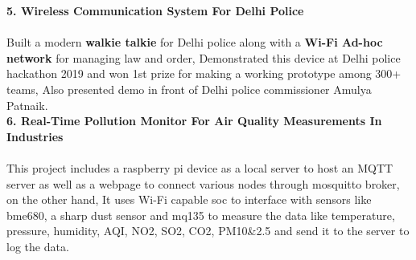 \documentclass[10pt]{report}
\begin{document}
\noindent\textbf{\large 5. Wireless Communication System For Delhi Police\\[1pt]}
\\Built a modern \textbf{walkie talkie} for Delhi police along with a \textbf{Wi-Fi Ad-hoc network} for managing law and order, Demonstrated this device at Delhi police hackathon 2019 and won 1st prize for making a working prototype among 300+ teams, Also presented demo in front of Delhi police commissioner Amulya Patnaik.
\\[1pt]






\noindent\textbf{\large 6. Real-Time Pollution Monitor For Air Quality Measurements In Industries\\[1pt] }
\\This project includes a raspberry pi device as a local server to host an MQTT server as well as a webpage to connect various nodes through mosquitto broker, on the other hand, It uses Wi-Fi capable soc to interface with sensors like bme680, a sharp dust sensor and mq135 to measure the data like temperature, pressure, humidity, AQI, NO2, SO2, CO2, PM10\&2.5 and send it to the server to log the data.
\\
	 
\\[2pt]
\end{document}
